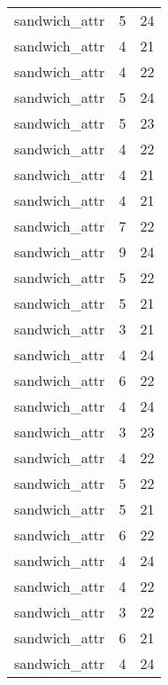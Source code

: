 \begin{table}
\begin{tabular}{lrr}
                   sandwich\_attr &         5 &        24 \\
                   sandwich\_attr &         4 &        21 \\
                   sandwich\_attr &         4 &        22 \\
                   sandwich\_attr &         5 &        24 \\
                   sandwich\_attr &         5 &        23 \\
                   sandwich\_attr &         4 &        22 \\
                   sandwich\_attr &         4 &        21 \\
                   sandwich\_attr &         4 &        21 \\
                   sandwich\_attr &         7 &        22 \\
                   sandwich\_attr &         9 &        24 \\
                   sandwich\_attr &         5 &        22 \\
                   sandwich\_attr &         5 &        21 \\
                   sandwich\_attr &         3 &        21 \\
                   sandwich\_attr &         4 &        24 \\
                   sandwich\_attr &         6 &        22 \\
                   sandwich\_attr &         4 &        24 \\
                   sandwich\_attr &         3 &        23 \\
                   sandwich\_attr &         4 &        22 \\
                   sandwich\_attr &         5 &        22 \\
                   sandwich\_attr &         5 &        21 \\
                   sandwich\_attr &         6 &        22 \\
                   sandwich\_attr &         4 &        24 \\
                   sandwich\_attr &         4 &        22 \\
                   sandwich\_attr &         3 &        22 \\
                   sandwich\_attr &         6 &        21 \\
                   sandwich\_attr &         4 &        24 \\

\end{tabular}
\end{table}
